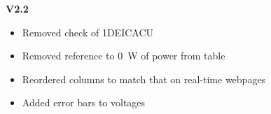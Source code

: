 \documentclass[11pt]{article}
\begin{document}
{\bf V2.2}
\begin{itemize}
\item Removed check of 1DEICACU
\item Removed reference to 0~W of power from table
\item Reordered columns to match that on real-time webpages
\item Added error bars to voltages
\end{itemize}

\newcommand{\tablecaptiontext}{TURN OFF DEA A (realtime version)}

\end{document}
